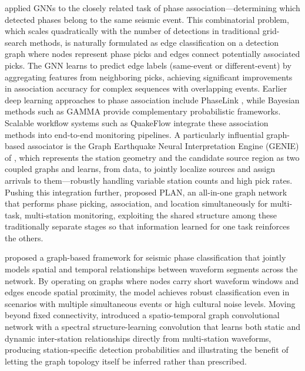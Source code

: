 \documentclass[review,authoryear]{elsarticle}
\begin{document}
\citet{munchmeyer2021gnn} applied GNNs to the closely related task of phase association---determining which detected phases belong to the same seismic event. This combinatorial problem, which scales quadratically with the number of detections in traditional grid-search methods, is naturally formulated as edge classification on a detection graph where nodes represent phase picks and edges connect potentially associated picks. The GNN learns to predict edge labels (same-event or different-event) by aggregating features from neighboring picks, achieving significant improvements in association accuracy for complex sequences with overlapping events. Earlier deep learning approaches to phase association include PhaseLink \citep{ross2019phaselink}, while Bayesian methods such as GAMMA \citep{zhu2022earthquake} provide complementary probabilistic frameworks. Scalable workflow systems such as QuakeFlow \citep{johnson2021quakeflow} integrate these association methods into end-to-end monitoring pipelines. A particularly influential graph-based associator is the Graph Earthquake Neural Interpretation Engine (GENIE) of \citet{mcbrearty2023genie}, which represents the station geometry and the candidate source region as two coupled graphs and learns, from data, to jointly localize sources and assign arrivals to them---robustly handling variable station counts and high pick rates. Pushing this integration further, \citet{si2024plan} proposed PLAN, an all-in-one graph network that performs phase picking, association, and location simultaneously for multi-task, multi-station monitoring, exploiting the shared structure among these traditionally separate stages so that information learned for one task reinforces the others.

\citet{bloemheuvel2022graph} proposed a graph-based framework for seismic phase classification that jointly models spatial and temporal relationships between waveform segments across the network. By operating on graphs where nodes carry short waveform windows and edges encode spatial proximity, the model achieves robust classification even in scenarios with multiple simultaneous events or high cultural noise levels. Moving beyond fixed connectivity, \citet{piriyasatit2025stgsl} introduced a spatio-temporal graph convolutional network with a spectral structure-learning convolution that learns both static and dynamic inter-station relationships directly from multi-station waveforms, producing station-specific detection probabilities and illustrating the benefit of letting the graph topology itself be inferred rather than prescribed.
\end{document}
